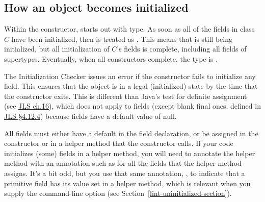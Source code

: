

\subsection{How an object becomes initialized\label{becoming-initialized}}

Within the constructor,
 starts out with  type.
As soon as all of the  fields
in class $C$ have been initialized, then  is treated as
.
This means that  is still being initialized, but all
initialization of $C$'s fields is complete, including all fields of supertypes.
Eventually, when all constructors complete, the type is
.

The Initialization Checker issues an error if the constructor fails to initialize
any  field.  This ensures that the object is in a legal (initialized)
state by the time that the constructor exits.
This is different than Java's test for definite assignment (see
\href{https://docs.oracle.com/javase/specs/jls/se8/html/jls-16.html}{JLS ch.16}),
which does not apply to fields (except blank final ones, defined in
\href{https://docs.oracle.com/javase/specs/jls/se8/html/jls-4.html#jls-4.12.4}{JLS \S 4.12.4}) because fields
have a default value of null.


All  fields must either have a
default in the field declaration, or be assigned in the constructor or in a
helper method that the constructor calls.  If
your code initializes (some) fields in a helper method, you will need to
annotate the helper method with an annotation such as
for all the fields that the helper method assigns.
It's a bit odd, but you use that same annotation, ,
to indicate that a primitive field has its value set in a helper method,
which is relevant when you supply the 
command-line option (see Section~\ref{lint-uninitialized-section}).



